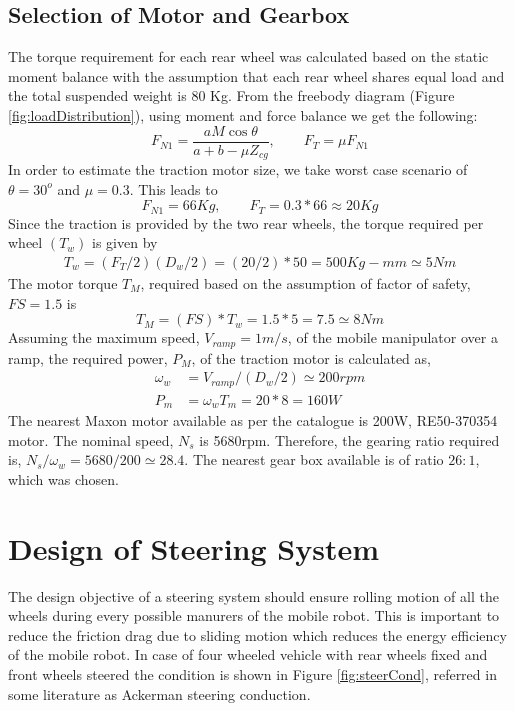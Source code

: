  \subsection {Selection of Motor and Gearbox}
 The torque requirement for each rear wheel was calculated based on the static moment balance with the assumption that each rear wheel shares equal load and the total suspended weight is 80 Kg. From the freebody diagram (Figure   \ref{fig:loadDistribution}), using moment and force balance  we get the following:
\begin{equation}
\label{eqn:t1}
F_{N1}=\frac{a M \cos \theta}{a+b-\mu Z_{cg}} , \quad \quad
F_T=\mu F_{N1}
\end{equation}
In order to estimate the traction motor size, we take worst case scenario of $\theta=30^o$ and $\mu =0.3$. This leads to
\begin{equation*}
F_{N1}=66 Kg, \quad\quad F_T=0.3*66 \approx 20Kg
\end{equation*}
 Since the traction is provided by the two rear wheels, the torque required per wheel $(T_w)$ is given by
\begin{eqnarray}
T_w=(F_T/2)(D_w/2)= (20/2)*50=500 Kg-mm \simeq 5 Nm
\end{eqnarray}
The motor torque $T_M$, required based on the assumption of factor of safety, $FS=1.5$ is
\begin{equation}
T_M=(FS)*T_w=1.5*5 =7.5 \simeq 8Nm
\end{equation}
 Assuming the maximum speed, $V_{ramp}=1m/s$, of the mobile manipulator over a ramp, the required power, $P_M$, of the traction motor is calculated as,
 \begin{equation}
 \begin{aligned}
\omega_w&=V_{ramp}/(D_w/2) \simeq 200rpm\\
P_m&=\omega_w T_m=20*8=160W
 \end{aligned}
 \end{equation}
 The nearest Maxon motor available as per the catalogue \cite{catMaxon} is 200W,  RE50-370354 motor.  The nominal speed, $N_s$ is 5680rpm. Therefore, the  gearing  ratio required is, $N_s/\omega_w=5680/200 \simeq 28.4$. The nearest gear box available  is of ratio $26:1$, which was chosen. 

\section{Design of Steering System }
The design objective of a steering system should ensure rolling motion of all the  wheels during every possible manurers of the mobile robot. This is important to reduce the friction drag due to sliding motion which reduces the energy efficiency of the mobile robot. In case of four wheeled vehicle with rear wheels fixed and front wheels steered the condition is  shown in Figure \ref{fig:steerCond},  referred in some literature as Ackerman steering conduction.   

